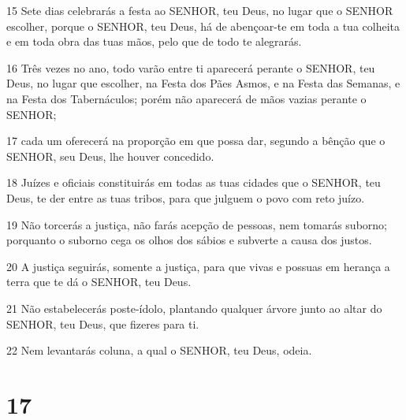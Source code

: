 \par 15 Sete dias celebrarás a festa ao SENHOR, teu Deus, no lugar que o SENHOR escolher, porque o SENHOR, teu Deus, há de abençoar-te em toda a tua colheita e em toda obra das tuas mãos, pelo que de todo te alegrarás.
\par 16 Três vezes no ano, todo varão entre ti aparecerá perante o SENHOR, teu Deus, no lugar que escolher, na Festa dos Pães Asmos, e na Festa das Semanas, e na Festa dos Tabernáculos; porém não aparecerá de mãos vazias perante o SENHOR;
\par 17 cada um oferecerá na proporção em que possa dar, segundo a bênção que o SENHOR, seu Deus, lhe houver concedido.
\par 18 Juízes e oficiais constituirás em todas as tuas cidades que o SENHOR, teu Deus, te der entre as tuas tribos, para que julguem o povo com reto juízo.
\par 19 Não torcerás a justiça, não farás acepção de pessoas, nem tomarás suborno; porquanto o suborno cega os olhos dos sábios e subverte a causa dos justos.
\par 20 A justiça seguirás, somente a justiça, para que vivas e possuas em herança a terra que te dá o SENHOR, teu Deus.
\par 21 Não estabelecerás poste-ídolo, plantando qualquer árvore junto ao altar do SENHOR, teu Deus, que fizeres para ti.
\par 22 Nem levantarás coluna, a qual o SENHOR, teu Deus, odeia.

\chapter{17}

